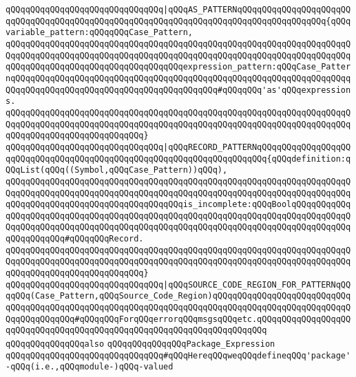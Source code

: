 \verb|qQQqqQQqqQQqqQQqqQQqqQQqqQQqqQQq|\verb#|qQQqAS_PATTERNqQQqqQQqqQQqqQQqqQQqqQQqqQQqqQQqqQQqqQQqqQQqqQQqqQQqqQQqqQQqqQQqqQQqqQQqqQQqqQQqqQQqqQQq{qQQqvariable_pattern:qQQqqQQqCase_Pattern,#\newline
\verb|qQQqqQQqqQQqqQQqqQQqqQQqqQQqqQQqqQQqqQQqqQQqqQQqqQQqqQQqqQQqqQQqqQQqqQQqqQQqqQQqqQQqqQQqqQQqqQQqqQQqqQQqqQQqqQQqqQQqqQQqqQQqqQQqqQQqqQQqqQQqqQQqqQQqqQQqqQQqqQQqqQQqqQQqqQQqqQQqexpression_pattern:qQQqCase_PatternqQQqqQQqqQQqqQQqqQQqqQQqqQQqqQQqqQQqqQQqqQQqqQQqqQQqqQQqqQQqqQQqqQQqqQQqqQQqqQQqqQQqqQQqqQQqqQQqqQQqqQQqqQQqqQQq#qQQqqQQq'as'qQQqexpressions.|\newline
\verb|qQQqqQQqqQQqqQQqqQQqqQQqqQQqqQQqqQQqqQQqqQQqqQQqqQQqqQQqqQQqqQQqqQQqqQQqqQQqqQQqqQQqqQQqqQQqqQQqqQQqqQQqqQQqqQQqqQQqqQQqqQQqqQQqqQQqqQQqqQQqqQQqqQQqqQQqqQQqqQQqqQQqqQQq}|\newline
\verb|qQQqqQQqqQQqqQQqqQQqqQQqqQQqqQQq|\verb#|qQQqRECORD_PATTERNqQQqqQQqqQQqqQQqqQQqqQQqqQQqqQQqqQQqqQQqqQQqqQQqqQQqqQQqqQQqqQQqqQQqqQQq{qQQqdefinition:qQQqList(qQQq((Symbol,qQQqCase_Pattern))qQQq),#\newline
\verb|qQQqqQQqqQQqqQQqqQQqqQQqqQQqqQQqqQQqqQQqqQQqqQQqqQQqqQQqqQQqqQQqqQQqqQQqqQQqqQQqqQQqqQQqqQQqqQQqqQQqqQQqqQQqqQQqqQQqqQQqqQQqqQQqqQQqqQQqqQQqqQQqqQQqqQQqqQQqqQQqqQQqqQQqqQQqqQQqis_incomplete:qQQqBoolqQQqqQQqqQQqqQQqqQQqqQQqqQQqqQQqqQQqqQQqqQQqqQQqqQQqqQQqqQQqqQQqqQQqqQQqqQQqqQQqqQQqqQQqqQQqqQQqqQQqqQQqqQQqqQQqqQQqqQQqqQQqqQQqqQQqqQQqqQQqqQQqqQQqqQQqqQQqqQQqqQQq#qQQqqQQqRecord.|\newline
\verb|qQQqqQQqqQQqqQQqqQQqqQQqqQQqqQQqqQQqqQQqqQQqqQQqqQQqqQQqqQQqqQQqqQQqqQQqqQQqqQQqqQQqqQQqqQQqqQQqqQQqqQQqqQQqqQQqqQQqqQQqqQQqqQQqqQQqqQQqqQQqqQQqqQQqqQQqqQQqqQQqqQQqqQQq}|\newline
\verb|qQQqqQQqqQQqqQQqqQQqqQQqqQQqqQQq|\verb#|qQQqSOURCE_CODE_REGION_FOR_PATTERNqQQqqQQq(Case_Pattern,qQQqSource_Code_Region)qQQqqQQqqQQqqQQqqQQqqQQqqQQqqQQqqQQqqQQqqQQqqQQqqQQqqQQqqQQqqQQqqQQqqQQqqQQqqQQqqQQqqQQqqQQqqQQqqQQqqQQqqQQqqQQq#\verb|#qQQqqQQqForqQQqerrorqQQqmsgsqQQqetc.qQQqqQQqqQQqqQQqqQQqqQQqqQQqqQQqqQQqqQQqqQQqqQQqqQQqqQQqqQQqqQQqqQQqqQQq|\newline
\newline
\newline
\newline
\verb|qQQqqQQqqQQqqQQqalso|\newline
\verb|qQQqqQQqqQQqqQQqPackage_Expression|\newline
\newline
\verb|qQQqqQQqqQQqqQQqqQQqqQQqqQQqqQQq#qQQqHereqQQqweqQQqdefineqQQq'package'-qQQq(i.e.,qQQqmodule-)qQQq-valued|\newline
